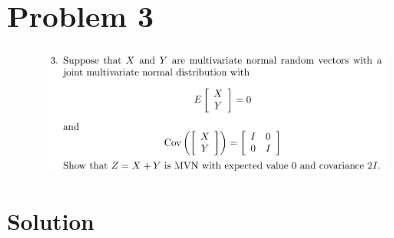 
\begingroup
\allowdisplaybreaks

\newpage
\section*{Problem 3}

\begin{figure}[h]
	\centering
	\includegraphics[width=0.8\textwidth]{./images/prob3_statement.png}
\end{figure}

\subsection*{Solution}

